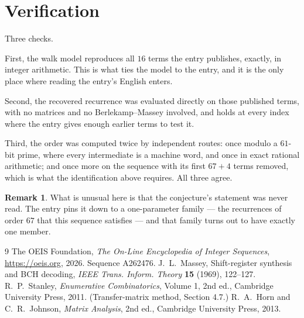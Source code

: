 \documentclass[11pt,a4paper]{article}
\theoremstyle{plain}
\theoremstyle{definition}
\newtheorem{remark}[theorem]{Remark}
\begin{document}
\section{Verification}

Three checks.

First, the walk model reproduces all $16$ terms the entry publishes, exactly, in integer
arithmetic. This is what ties the model to the entry, and it is the only place where reading
the entry's English enters.

Second, the recovered recurrence was evaluated directly on those published terms, with no
matrices and no Berlekamp--Massey involved, and holds at every index where the entry gives
enough earlier terms to test it.

Third, the order was computed twice by independent routes: once modulo a $61$-bit prime, where
every intermediate is a machine word, and once in exact rational arithmetic; and once more on
the sequence with its first $67+4$ terms removed, which is what the identification above
requires. All three agree.

\begin{remark}
What is unusual here is that the conjecture's statement was never read. The entry pins it down
to a one-parameter family --- the recurrences of order $67$ that this sequence satisfies
--- and that family turns out to have exactly one member.
\end{remark}

\begin{thebibliography}{9}
 The OEIS Foundation, \emph{The On-Line Encyclopedia of Integer
Sequences}, \url{https://oeis.org}, 2026. Sequence A262476.
 J.~L.~Massey, Shift-register synthesis and BCH decoding, \emph{IEEE
Trans. Inform. Theory} \textbf{15} (1969), 122--127.
 R.~P.~Stanley, \emph{Enumerative Combinatorics}, Volume 1, 2nd ed.,
Cambridge University Press, 2011. (Transfer-matrix method, Section 4.7.)
 R.~A.~Horn and C.~R.~Johnson, \emph{Matrix Analysis}, 2nd ed., Cambridge
University Press, 2013.
\end{thebibliography}
\end{document}
